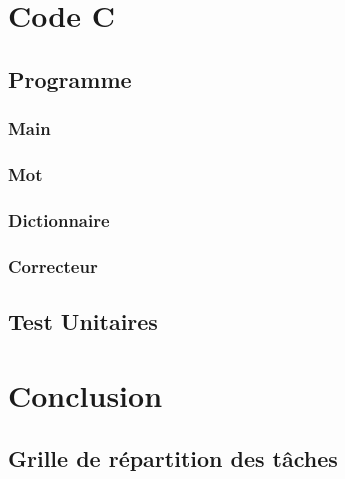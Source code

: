 \documentclass[11pt,a4paper]{article}
\begin{document}
        
        \clearpage
        
        
        \clearpage
        
        
        \clearpage
    \section{Code C}
        \subsection{Programme}
                \subsubsection{Main}
                

                \clearpage
                \subsubsection{Mot}
                
                
                \clearpage
                \subsubsection{Dictionnaire}
                
                
                \clearpage
                \subsubsection{Correcteur}
                
                
                \clearpage
        \subsection{Test Unitaires}
        
        
        \clearpage    
    \section*{Conclusion}
        \subsection*{Grille de répartition des tâches}
        
\end{document}
